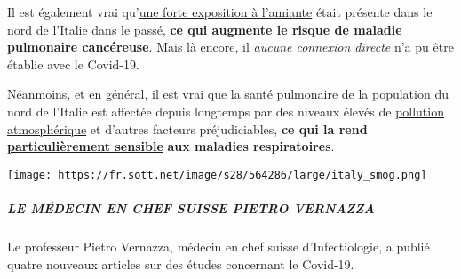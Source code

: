 Il est également vrai
qu'\href{https://www.spiegel.de/panorama/justiz/asbest-prozess-in-italien-nun-sind-alle-krank-a-666421.html}{une
forte exposition à l'amiante} était présente dans le nord de l'Italie
dans le passé, \textbf{ce qui augmente le risque de maladie pulmonaire
cancéreuse}. Mais là encore, il \emph{aucune connexion directe} n'a pu
être établie avec le Covid-19.

Néanmoins, et en général, il est vrai que la santé pulmonaire de la
population du nord de l'Italie est affectée depuis longtemps par des
niveaux élevés de
\href{https://twitter.com/esa/status/1238480433047916545}{pollution
atmosphérique} et d'autres facteurs préjudiciables, \textbf{ce qui la
rend}
\href{https://www.thelocal.it/20170131/our-lungs-are-breaking-smog-levels-way-above-safe-limits-in-northern-italy}{\textbf{particulièrement
sensible}} \textbf{aux maladies respiratoires}.

\texttt{[image: https://fr.sott.net/image/s28/564286/large/italy\_smog.png]}

\hypertarget{le-muxe9decin-en-chef-suisse-pietro-vernazza}{%
\subparagraph{\texorpdfstring{\textbf{LE MÉDECIN EN CHEF SUISSE PIETRO
VERNAZZA}}{LE MÉDECIN EN CHEF SUISSE PIETRO VERNAZZA}}\label{le-muxe9decin-en-chef-suisse-pietro-vernazza}}

Le professeur Pietro Vernazza, médecin en chef suisse d'Infectiologie, a
publié quatre nouveaux articles sur des études concernant le Covid-19.

